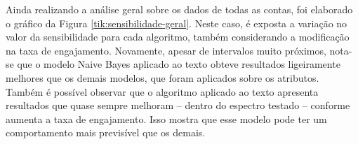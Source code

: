 \documentclass[oneside,openright,12pt]{ufsm_2015} %
\begin{document}
    \par Ainda realizando a análise geral sobre os dados de todas as contas, foi elaborado o gráfico da Figura \ref{tik:sensibilidade-geral}. Neste caso, é exposta a variação no valor da sensibilidade para cada algoritmo, também considerando a modificação na taxa de engajamento. Novamente, apesar de intervalos muito próximos, nota-se que o modelo Naive Bayes aplicado ao texto obteve resultados ligeiramente melhores que os demais modelos, que foram aplicados sobre os atributos. Também é possível observar que o algoritmo aplicado ao texto apresenta resultados que quase sempre melhoram -- dentro do espectro testado -- conforme aumenta a taxa de engajamento. Isso mostra que esse modelo pode ter um comportamento mais previsível que os demais.
    
    \mydata
    
\end{document}
